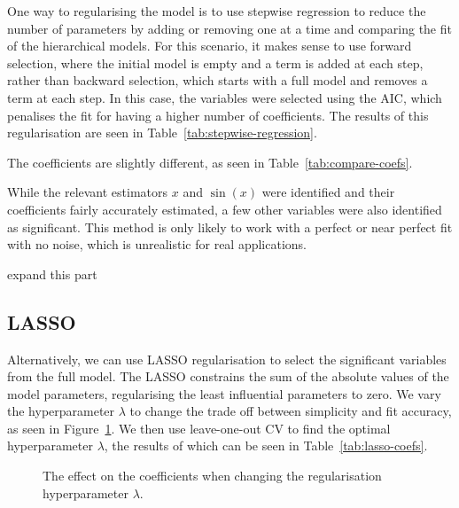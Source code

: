 One way to regularising the model is to use stepwise regression to reduce the number of parameters by adding or removing one at a time and comparing the fit of the hierarchical models.
For this scenario, it makes sense to use forward selection, where the initial model is empty and a term is added at each step, rather than backward selection, which starts with a full model and removes a term at each step.
In this case, the variables were selected using the \ac{AIC}, which penalises the fit for having a higher number of coefficients.
The results of this regularisation are seen in Table~\ref{tab:stepwise-regression}.

The coefficients are slightly different, as seen in Table~\ref{tab:compare-coefs}.


While the relevant estimators \(x\) and \(\sin(x)\) were identified and their coefficients fairly accurately estimated, a few other variables were also identified as significant.
This method is only likely to work with a perfect or near perfect fit with no noise, which is unrealistic for real applications.

\begin{todo}
	expand this part
\end{todo}

\subsection{LASSO}

Alternatively, we can use \ac{LASSO} regularisation to select the significant variables from the full model.
The \ac{LASSO} constrains the sum of the absolute values of the model parameters, regularising the least influential parameters to zero.
We vary the hyperparameter \(\lambda\) to change the trade off between simplicity and fit accuracy, as seen in Figure~\ref{fig:lasso-lambda}.
We then use leave-one-out \ac{CV} to find the optimal hyperparameter \(\lambda\), the results of which can be seen in Table~\ref{tab:lasso-coefs}.

\begin{figure}[htbp]
	\centering
	
	\caption{The effect on the coefficients when changing the regularisation hyperparameter \(\lambda\).}
	\label{fig:lasso-lambda}
\end{figure}

